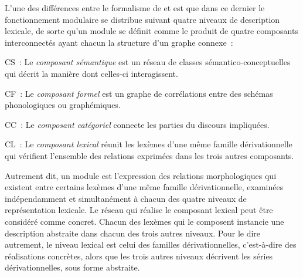 \documentclass[output=paper]{langsci/langscibook}
\begin{document}
L'une des différences entre le formalisme de \cite{Bochner93} et \paradis{} est que dans ce dernier le fonctionnement modulaire  se distribue suivant quatre niveaux de description lexicale, de sorte qu'un module se définit comme le produit de quatre composants interconnectés ayant chacun la structure d'un graphe connexe~:
%
\begin{description}
\item CS~: Le \emph{composant sémantique} est un réseau de classes sémantico-conceptuelles qui décrit la manière dont celles-ci interagissent.
\item CF~: Le \emph{composant formel} est un graphe de corrélations entre des schémas phonologiques ou graphémiques.
\item CC~: Le \emph{composant catégoriel} connecte les parties du discours impliquées.
\item CL~: Le \emph{composant lexical} réunit les lexèmes d'une même famille dérivationnelle qui vérifient l'ensemble des relations exprimées dans les trois autres composants.
\end{description}
%
Autrement dit, un module est l'expression des relations morphologiques qui existent entre certains lexèmes d'une même famille dérivationnelle, examinées indépendamment et simultanément à chacun des quatre niveaux de représentation lexicale. Le réseau qui réalise le composant lexical peut être considéré comme concret.  Chacun des lexèmes qui le composent instancie une description abstraite dans chacun des trois autres niveaux. Pour le dire autrement, le niveau lexical est celui des familles dérivationnelles, c'est-à-dire des réalisations concrètes, alors que les trois autres niveaux décrivent les séries dérivationnelles, sous forme abstraite.
\end{document}
